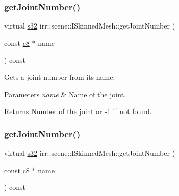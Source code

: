 \subsubsection{\texorpdfstring{get\+Joint\+Number()}{getJointNumber()}\hspace{0.1cm}{\footnotesize\ttfamily [1/2]}}
{\footnotesize\ttfamily virtual \hyperlink{namespaceirr_ac66849b7a6ed16e30ebede579f9b47c6}{s32} irr\+::scene\+::\+I\+Skinned\+Mesh\+::get\+Joint\+Number (\begin{DoxyParamCaption}\item[{const \hyperlink{namespaceirr_a9395eaea339bcb546b319e9c96bf7410}{c8} $\ast$}]{name }\end{DoxyParamCaption}) const\hspace{0.3cm}{\ttfamily [pure virtual]}}



Gets a joint number from its name. 


\begin{DoxyParams}{Parameters}
{\em name} & Name of the joint. \\
\hline
\end{DoxyParams}
\begin{DoxyReturn}{Returns}
Number of the joint or -\/1 if not found. 
\end{DoxyReturn}
\mbox{\label{classirr_1_1scene_1_1ISkinnedMesh_ace7288f54490d017efebe24c3eb46ab8}} 
\subsubsection{\texorpdfstring{get\+Joint\+Number()}{getJointNumber()}\hspace{0.1cm}{\footnotesize\ttfamily [2/2]}}
{\footnotesize\ttfamily virtual \hyperlink{namespaceirr_ac66849b7a6ed16e30ebede579f9b47c6}{s32} irr\+::scene\+::\+I\+Skinned\+Mesh\+::get\+Joint\+Number (\begin{DoxyParamCaption}\item[{const \hyperlink{namespaceirr_a9395eaea339bcb546b319e9c96bf7410}{c8} $\ast$}]{name }\end{DoxyParamCaption}) const\hspace{0.3cm}{\ttfamily [pure virtual]}}



